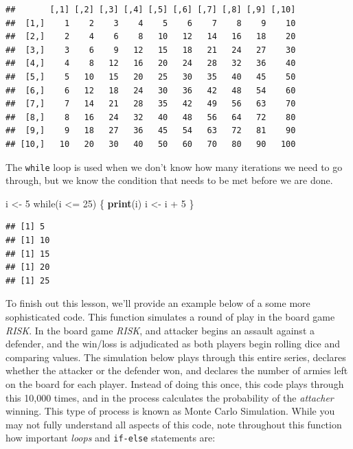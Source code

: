 \documentclass[]{book}
\newenvironment{Shaded}{\begin{snugshade}}{\end{snugshade}}
\newcommand{\KeywordTok}[1]{\textcolor[rgb]{0.13,0.29,0.53}{\textbf{{#1}}}}
\newcommand{\DecValTok}[1]{\textcolor[rgb]{0.00,0.00,0.81}{{#1}}}
\newcommand{\StringTok}[1]{\textcolor[rgb]{0.31,0.60,0.02}{{#1}}}
\newcommand{\NormalTok}[1]{{#1}}
\begin{document}
\begin{verbatim}
##       [,1] [,2] [,3] [,4] [,5] [,6] [,7] [,8] [,9] [,10]
##  [1,]    1    2    3    4    5    6    7    8    9    10
##  [2,]    2    4    6    8   10   12   14   16   18    20
##  [3,]    3    6    9   12   15   18   21   24   27    30
##  [4,]    4    8   12   16   20   24   28   32   36    40
##  [5,]    5   10   15   20   25   30   35   40   45    50
##  [6,]    6   12   18   24   30   36   42   48   54    60
##  [7,]    7   14   21   28   35   42   49   56   63    70
##  [8,]    8   16   24   32   40   48   56   64   72    80
##  [9,]    9   18   27   36   45   54   63   72   81    90
## [10,]   10   20   30   40   50   60   70   80   90   100
\end{verbatim}

The \texttt{while} loop is used when we don't know how many iterations
we need to go through, but we know the condition that needs to be met
before we are done.

\begin{Shaded}
\begin{Highlighting}[]
\NormalTok{i <-}\StringTok{ }\DecValTok{5}
\NormalTok{while(i <=}\StringTok{ }\DecValTok{25}\NormalTok{) \{}
  \KeywordTok{print}\NormalTok{(i)}
  \NormalTok{i <-}\StringTok{ }\NormalTok{i +}\StringTok{ }\DecValTok{5}
\NormalTok{\}}
\end{Highlighting}
\end{Shaded}

\begin{verbatim}
## [1] 5
## [1] 10
## [1] 15
## [1] 20
## [1] 25
\end{verbatim}

To finish out this lesson, we'll provide an example below of a some more
sophisticated code. This function simulates a round of play in the board
game \emph{RISK}. In the board game \emph{RISK}, and attacker begins an
assault against a defender, and the win/loss is adjudicated as both
players begin rolling dice and comparing values. The simulation below
plays through this entire series, declares whether the attacker or the
defender won, and declares the number of armies left on the board for
each player. Instead of doing this once, this code plays through this
10,000 times, and in the process calculates the probability of the
\emph{attacher} winning. This type of process is known as Monte Carlo
Simulation. While you may not fully understand all aspects of this code,
note throughout this function how important \emph{loops} and
\texttt{if-else} statements are:
\end{document}
